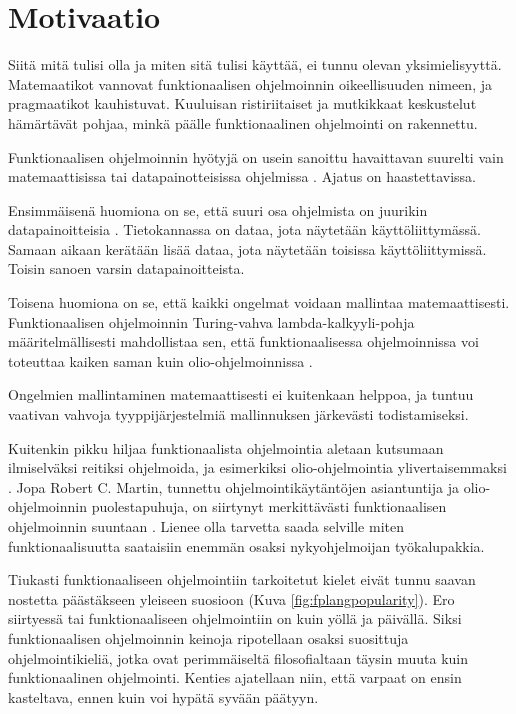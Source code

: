 
\chapter{Motivaatio}

Siitä mitä  tulisi olla ja miten sitä tulisi käyttää, ei tunnu olevan yksimielisyyttä. Matemaatikot vannovat funktionaalisen ohjelmoinnin oikeellisuuden nimeen, ja pragmaatikot kauhistuvat. Kuuluisan ristiriitaiset ja mutkikkaat keskustelut hämärtävät pohjaa, minkä päälle funktionaalinen ohjelmointi on rakennettu. \citep{stackoverflow_what_monad,stackoverflow:why_monad,promises-spec-94}

Funktionaalisen ohjelmoinnin hyötyjä on usein sanoittu havaittavan suurelti vain matemaattisissa tai datapainotteisissa ohjelmissa \cite[10]{cantarella_fp_haitat}. Ajatus on haastettavissa.

Ensimmäisenä huomiona on se, että suuri osa ohjelmista on juurikin datapainoitteisia \cite{gartnerb2b}. Tietokannassa on dataa, jota näytetään käyttöliittymässä. Samaan aikaan kerätään lisää dataa, jota näytetään toisissa käyttöliittymissä. Toisin sanoen varsin datapainoitteista.

Toisena huomiona on se, että kaikki ongelmat voidaan mallintaa matemaattisesti. Funktionaalisen ohjelmoinnin Turing-vahva lambda-kalkyyli-pohja määritelmällisesti mahdollistaa sen, että funktionaalisessa ohjelmoinnissa voi toteuttaa kaiken saman kuin olio-ohjelmoinnissa \cite{Tan2004,computerphile_lambda}.

Ongelmien mallintaminen matemaattisesti ei kuitenkaan helppoa, ja tuntuu vaativan vahvoja tyyppijärjestelmiä mallinnuksen järkevästi todistamiseksi.

Kuitenkin pikku hiljaa funktionaalista ohjelmointia aletaan kutsumaan ilmiselväksi reitiksi ohjelmoida, ja esimerkiksi olio-ohjelmointia ylivertaisemmaksi \cite[1]{the_oo_way}. Jopa Robert C. Martin, tunnettu ohjelmointikäytäntöjen asiantuntija ja olio-ohjelmoinnin puolestapuhuja, on siirtynyt merkittävästi funktionaalisen ohjelmoinnin suuntaan \cite{martin2019whyclojure,martin2017pragmaticfp}. Lienee olla tarvetta saada selville miten funktionaalisuutta saataisiin enemmän osaksi nykyohjelmoijan työkalupakkia.

Tiukasti funktionaaliseen ohjelmointiin tarkoitetut kielet eivät tunnu saavan nostetta päästäkseen yleiseen suosioon (Kuva \ref{fig:fplangpopularity}). Ero siirtyessä  tai  funktionaaliseen ohjelmointiin on kuin yöllä ja päivällä. Siksi funktionaalisen ohjelmoinnin keinoja ripotellaan osaksi suosittuja ohjelmointikieliä, jotka ovat perimmäiseltä filosofialtaan täysin muuta kuin funktionaalinen ohjelmointi. Kenties ajatellaan niin, että varpaat on ensin kasteltava, ennen kuin voi hypätä syvään päätyyn.

